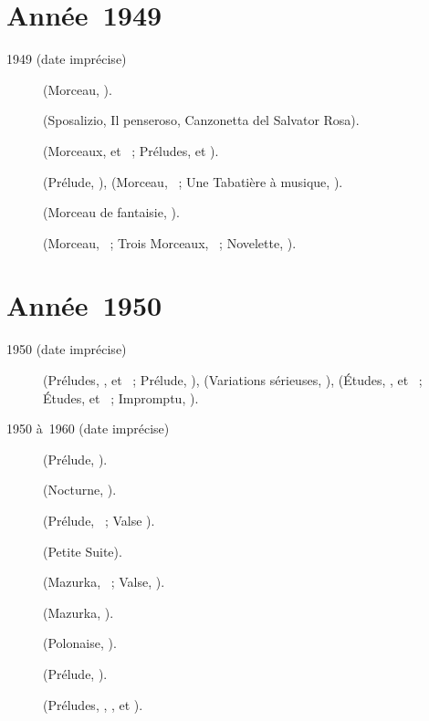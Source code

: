 \section{Année~1949}

\begin{description}
 \item[1949 (date imprécise)]
 \Scriabine{} (Morceau,  ).
 \item[]
 \Liszt{} (Sposalizio, Il penseroso, Canzonetta del Salvator Rosa).
 \item[]
 \Liadov{} (Morceaux,   et  ~;
 Préludes,   et  ).
 \item[]
 \Chopin{} (Prélude,  ), \Liadov{} (Morceau, 
 ~; Une Tabatière à musique, ).
 \item[]
 \Rachmaninov{} (Morceau de fantaisie,  ).
 \item[]
 \Liadov{} (Morceau,  ~; Trois Morceaux, ~;
 Novelette, ).
\end{description}

\section{Année~1950}

\begin{description}
 \item[1950 (date imprécise)]
 \Chopin{} (Préludes,  ,  et ~;
 Prélude, ), \Mendelssohn{} (Variations sérieuses, ),
 \Scriabine{} (Études,  ,  et ~;
 Études,   et ~; Impromptu, 
 ).
 \item[1950 à~1960 (date imprécise)]
 \Scriabine{} (Prélude,  ).
 \item[]
 \Chopin{} (Nocturne,  ).
 \item[]
 \Chopin{} (Prélude,  ~; Valse  ).
 \item[]
 \Borodine{} (Petite Suite).
 \item[]
 \Chopin{} (Mazurka,  ~; Valse,  ).
 \item[]
 \Chopin{} (Mazurka,  ).
 \item[]
 \Scriabine{} (Polonaise, ).
 \item[]
 \Chopin{} (Prélude,  ).
 \item[]
 \Chopin{} (Préludes,  , ,  et
 ).
\end{description}


